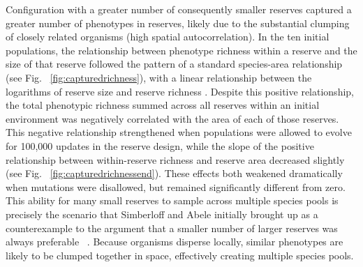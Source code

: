 \documentclass[letterpaper]{article}
\begin{document}
    Configuration with a greater number of consequently smaller reserves captured a greater number of phenotypes in reserves, likely due to the substantial clumping of closely related organisms (high spatial autocorrelation). In the ten initial populations, the relationship between phenotype richness within a reserve and the size of that reserve followed the pattern of a standard species-area relationship (see Fig. ~\ref{fig:capturedrichness}), with a linear relationship between the logarithms of reserve size and reserve richness \citep{connor_statistics_1979}. Despite this positive relationship, the total phenotypic richness summed across all reserves within an initial environment was negatively correlated with the area of each of those reserves. This negative relationship strengthened when populations were allowed to evolve for 100,000 updates in the reserve design, while the slope of the positive relationship between within-reserve richness and reserve area decreased slightly (see Fig. ~\ref{fig:capturedrichnessend}). These effects both weakened dramatically when mutations were disallowed, but remained significantly different from zero. This ability for many small reserves to sample across multiple species pools is precisely the scenario that Simberloff and Abele initially brought up as a counterexample to the argument that a smaller number of larger reserves was always preferable ~\citep{simberloff_island_1976}. Because organisms disperse locally, similar phenotypes are likely to be clumped together in space, effectively creating multiple species pools. 
%
%
%
%
%
%
%
%
%
%
\end{document}
